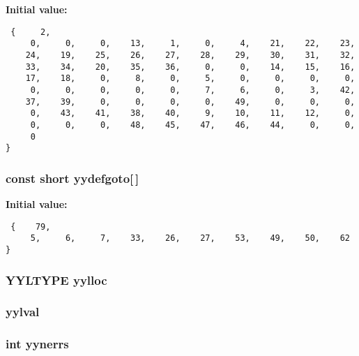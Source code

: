 {\bf Initial value:}

\footnotesize\begin{verbatim} {     2,
     0,     0,     0,    13,     1,     0,     4,    21,    22,    23,
    24,    19,    25,    26,    27,    28,    29,    30,    31,    32,
    33,    34,    20,    35,    36,     0,     0,    14,    15,    16,
    17,    18,     0,     8,     0,     5,     0,     0,     0,     0,
     0,     0,     0,     0,     0,     7,     6,     0,     3,    42,
    37,    39,     0,     0,     0,     0,    49,     0,     0,     0,
     0,    43,    41,    38,    40,     9,    10,    11,    12,     0,
     0,     0,     0,    48,    45,    47,    46,    44,     0,     0,
     0
}\end{verbatim}\normalsize 
{}
\subsubsection{\setlength{\rightskip}{0pt plus 5cm}const short yydefgoto[$\,$]\hspace{0.3cm}{\tt  [static]}}\label{vcd__parser_8c_a91}


{\bf Initial value:}

\footnotesize\begin{verbatim} {    79,
     5,     6,     7,    33,    26,    27,    53,    49,    50,    62
}\end{verbatim}\normalsize 
{}
\subsubsection{\setlength{\rightskip}{0pt plus 5cm}YYLTYPE yylloc}\label{vcd__parser_8c_a98}


\subsubsection{ yylval}\label{vcd__parser_8c_a97}


\subsubsection{\setlength{\rightskip}{0pt plus 5cm}int yynerrs}\label{vcd__parser_8c_a99}


